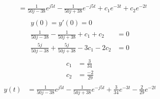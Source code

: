 \documentclass[10pt,a4paper, margin=1in]{article}
\begin{document}
\begin{enumerate}
\begin{enumerate}
\begin{align*}
        & = \frac{1}{50j - 38}e^{j5t} - \frac{1}{50j + 38}e^{-j5t} + c_1e^{-3t} + c_2e^{-2t}\\
    \end{align*}
    \begin{align*}
        y(0) = y'(0) = 0& \\
        \frac{1}{50j - 38} - \frac{1}{50j + 38} + c_1 + c_2 & = 0\\
        \frac{5j}{50j - 38} + \frac{5j}{50j + 38} - 3c_1 - 2c_2 & = 0\\
    \end{align*}
    \begin{align*}
        c_1 & = \frac{3}{34} \\
        c_2 & = \frac{-2}{29} \\
    \end{align*}
    \begin{align*}
        y(t) & = \frac{1}{50j - 38}e^{j5t} - \frac{1}{50j + 38}e^{-j5t} + \frac{3}{34}e^{-3t} - \frac{2}{29}e^{-2t}\\
    \end{align*}
    \end{enumerate}    
    

\end{enumerate}
\end{document}
